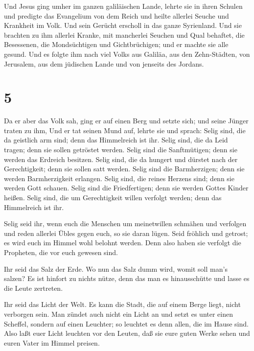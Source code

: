  Und Jesus ging umher im ganzen galiläischen Lande, lehrte
sie in ihren Schulen und predigte das Evangelium von dem Reich und
heilte allerlei Seuche und Krankheit im Volk.  Und sein
Gerücht erscholl in das ganze Syrienland. Und sie brachten zu ihm
allerlei Kranke, mit mancherlei Seuchen und Qual behaftet, die
Besessenen, die Mondsüchtigen und Gichtbrüchigen; und er machte sie alle
gesund.  Und es folgte ihm nach viel Volks aus Galiläa, aus
den Zehn-Städten, von Jerusalem, aus dem jüdischen Lande und von
jenseits des Jordans.

\hypertarget{section-4}{%
\section{5}\label{section-4}}

 Da er aber das Volk sah, ging er auf einen Berg und setzte
sich; und seine Jünger traten zu ihm,  Und er tat seinen
Mund auf, lehrte sie und sprach:  Selig sind, die da
geistlich arm sind; denn das Himmelreich ist ihr.  Selig
sind, die da Leid tragen; denn sie sollen getröstet werden. 
Selig sind die Sanftmütigen; denn sie werden das Erdreich besitzen.
 Selig sind, die da hungert und dürstet nach der
Gerechtigkeit; denn sie sollen satt werden.  Selig sind die
Barmherzigen; denn sie werden Barmherzigkeit erlangen. 
Selig sind, die reines Herzens sind; denn sie werden Gott schauen.
 Selig sind die Friedfertigen; denn sie werden Gottes Kinder
heißen.  Selig sind, die um Gerechtigkeit willen verfolgt
werden; denn das Himmelreich ist ihr.

 Selig seid ihr, wenn euch die Menschen um meinetwillen
schmähen und verfolgen und reden allerlei Übles gegen euch, so sie daran
lügen.  Seid fröhlich und getrost; es wird euch im Himmel
wohl belohnt werden. Denn also haben sie verfolgt die Propheten, die vor
euch gewesen sind.

 Ihr seid das Salz der Erde. Wo nun das Salz dumm wird,
womit soll man's salzen? Es ist hinfort zu nichts nütze, denn das man es
hinausschütte und lasse es die Leute zertreten.

 Ihr seid das Licht der Welt. Es kann die Stadt, die auf
einem Berge liegt, nicht verborgen sein.  Man zündet auch
nicht ein Licht an und setzt es unter einen Scheffel, sondern auf einen
Leuchter; so leuchtet es denn allen, die im Hause sind. 
Also laßt euer Licht leuchten vor den Leuten, daß sie eure guten Werke
sehen und euren Vater im Himmel preisen.

